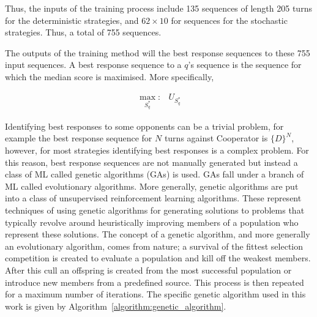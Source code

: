 \documentclass{article}
\begin{document}
Thus, the inputs of the training process include 135 sequences of length 205
turns for the deterministic strategies, and \(62 \times 10\) for sequences
for the stochastic strategies. Thus, a total of 755 sequences.

The outputs of the training method will the best response sequences to these
755 input sequences. A best response sequence to a \(q\)'s sequence is the
sequence for which the median score is maximised. More specifically,

\begin{equation}\label{eq:best_response}
    \begin{aligned}
    \max_{S_q^*}: & U_{S_q ^*}
    \end{aligned}
\end{equation}

Identifying best responses to some opponents can be a trivial problem, for
example the best response sequence for \(N\) turns against Cooperator is
\(\{D\}^N\), however, for most strategies identifying best responses is a
complex problem. For this reason, best response sequences are not manually
generated but instead a class of ML called genetic algorithms (GAs) is used. GAs
fall under a branch of ML called evolutionary algorithms. More generally,
genetic algorithms are put into a class of unsupervised reinforcement learning
algorithms. These represent techniques of using genetic algorithms for
generating solutions to problems that typically revolve around heuristically
improving members of a population who represent these solutions. The concept of
a genetic algorithm, and more generally an evolutionary algorithm, comes from
nature; a survival of the fittest selection competition is created to
evaluate a population and kill off the weakest members. After this cull an
offspring is created from the most successful population or introduce new members
from a predefined source. This process is then repeated for a maximum number
of iterations. The specific genetic algorithm used in this work is given by
Algorithm~\ref{algorithm:genetic_algorithm}.
\end{document}
